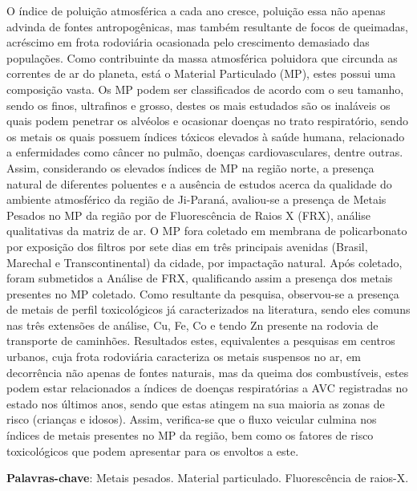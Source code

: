 \documentclass[article,12pt,onesidea,4paper,english,brazil]{abntex2}
\begin{document}
	\noindent O índice de poluição atmosférica a cada ano cresce, poluição essa não apenas
	advinda de fontes antropogênicas, mas também resultante de focos de queimadas,
	acréscimo em frota rodoviária ocasionada pelo crescimento demasiado das
	populações. Como contribuinte da massa atmosférica poluidora que circunda as
	correntes de ar do planeta, está o Material Particulado (MP), estes possui uma
	composição vasta. Os MP podem ser classificados de acordo com o seu tamanho,
	sendo os finos, ultrafinos e grosso, destes os mais estudados são os inaláveis os
	quais podem penetrar os alvéolos e ocasionar doenças no trato respiratório, sendo
	os metais os quais possuem índices tóxicos elevados à saúde humana, relacionado
	a enfermidades como câncer no pulmão, doenças cardiovasculares, dentre outras.
	Assim, considerando os elevados índices de MP na região norte, a presença natural
	de diferentes poluentes e a ausência de estudos acerca da qualidade do ambiente
	atmosférico da região de Ji-Paraná, avaliou-se a presença de Metais Pesados no
	MP da região por de Fluorescência de Raios X (FRX), análise qualitativas da matriz
	de ar. O MP fora coletado em membrana de policarbonato por exposição dos filtros
	por sete dias em três principais avenidas (Brasil, Marechal e Transcontinental) da
	cidade, por impactação natural. Após coletado, foram submetidos a Análise de FRX,
	qualificando assim a presença dos metais presentes no MP coletado. Como
	resultante da pesquisa, observou-se a presença de metais de perfil toxicológicos já
	caracterizados na literatura, sendo eles comuns nas três extensões de análise, Cu,
	Fe, Co e tendo Zn presente na rodovia de transporte de caminhões. Resultados
	estes, equivalentes a pesquisas em centros urbanos, cuja frota rodoviária
	caracteriza os metais suspensos no ar, em decorrência não apenas de fontes
	naturais, mas da queima dos combustíveis, estes podem estar relacionados a
	índices de doenças respiratórias a AVC registradas no estado nos últimos anos,
	sendo que estas atingem na sua maioria as zonas de risco (crianças e idosos).
	Assim, verifica-se que o fluxo veicular culmina nos índices de metais presentes no
	MP da região, bem como os fatores de risco toxicológicos que podem apresentar para os 
	envoltos a este.
	
	\vspace{\onelineskip}
	
	\noindent
	\textbf{Palavras-chave}: Metais pesados. Material particulado. Fluorescência de raios-X.
	
\end{document}
